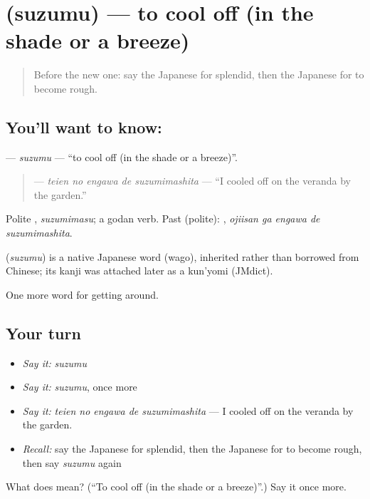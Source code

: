 \section[\texorpdfstring{\ja{すずむ} (suzumu)}{すずむ (suzumu)}]{ (suzumu) — to cool off (in the shade or a breeze)}

\label{lesson:JA-C405-suzumu}



\begin{quote}
Before the new one: say the Japanese for splendid, then the Japanese for to become rough.
\end{quote}

\subsection*{You'll want to know: }
\textbf{} — \emph{suzumu} — \textquotedblleft{}to cool off (in the shade or a breeze)\textquotedblright{}.

\begin{quote}
\textbf{  } — \emph{teien no engawa de suzumimashita} — \textquotedblleft{}I cooled off on the veranda by the garden.\textquotedblright{}
\end{quote}

Polite \textbf{}, \emph{suzumimasu}; a godan verb. Past (polite): \textbf{  }, \emph{ojiisan ga engawa de suzumimashita}.

\begin{cousinweb}
\textbf{} (\emph{suzumu}) is a native Japanese word (wago), inherited rather than borrowed from Chinese; its kanji was attached later as a kun'yomi (JMdict).
\end{cousinweb}

\begin{grammarlens}[title={What you've built}]
One more word for getting around.
\end{grammarlens}

\subsection*{Your turn}
\begin{itemize}
\raggedright
  \item \emph{Say it:} \emph{suzumu}
  \item \emph{Say it:} \emph{suzumu}, once more
  \item \emph{Say it:} \emph{teien no engawa de suzumimashita} — I cooled off on the veranda by the garden.
  \item \emph{Recall:} say the Japanese for splendid, then the Japanese for to become rough, then say \emph{suzumu} again
\end{itemize}

\begin{tcolorbox}[breakable,colback=teal!4,colframe=teal!35!black,title={Before you move on}]
What does  mean? (\textquotedblleft{}To cool off (in the shade or a breeze)\textquotedblright{}.) Say it once more.
\end{tcolorbox}
